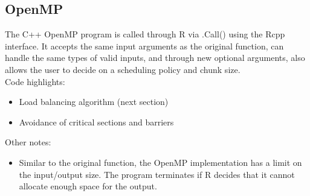 \subsection{OpenMP}

The C++ OpenMP program is called through R via .Call() using the Rcpp interface. It accepts the same input arguments as the original function, can handle the same types of valid inputs, and through new optional arguments, also allows the user to decide on a scheduling policy and chunk size.\\
\null
Code highlights:\\
\begin{itemize}
\item Load balancing algorithm \cite{parallelalgorithm} (next section)
\item Avoidance of critical sections and barriers
\end{itemize}
Other notes:
\begin{itemize}
\item Similar to the original function, the OpenMP implementation has a limit on the input/output size. The program terminates if R decides that it cannot allocate enough space for the output.
\end{itemize}

